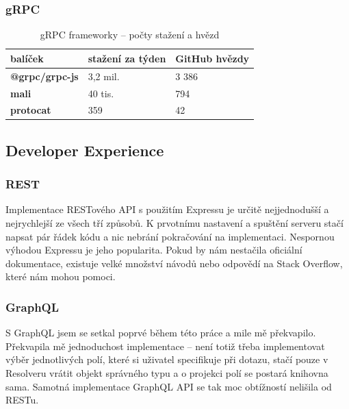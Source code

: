 \documentclass[thesis=M,czech]{FITthesis}[2019/12/23]
\begin{document}
\subsubsection*{gRPC}
\begin{table}[h]
  \begin{tabular}{|l|l|l|}
  \hline
  \textbf{balíček}                                 & \textbf{stažení za týden}                           & \textbf{GitHub hvězdy} \\ \hline
  \textbf{@grpc/grpc-js}                           & 3,2 mil.                                            & 3 386                  \\ \hline
  \textbf{mali}                                    & 40 tis.                                             & 794                    \\ \hline
  \textbf{protocat}                                & 359                                                 & 42                     \\ \hline
  \end{tabular}
  \caption{gRPC frameworky -- počty stažení a hvězd \cite{grpc_trends}}
\end{table}

\subsection{Developer Experience}
\subsubsection*{REST}
Implementace RESTového API s použitím Expressu je určitě nejjednodušší a nejrychlejší ze všech tří způsobů. K prvotnímu nastavení a spuštění serveru stačí napsat pár řádek kódu a nic nebrání pokračování na implementaci.
Nespornou výhodou Expressu je jeho popularita. Pokud by nám nestačila oficiální dokumentace, existuje velké množství návodů nebo odpovědí na Stack Overflow, které nám mohou pomoci.

\subsubsection*{GraphQL}
S GraphQL jsem se setkal poprvé během této práce a mile mě překvapilo. Překvapila mě jednoduchost implementace -- není totiž třeba implementovat výběr jednotlivých polí, které si uživatel specifikuje při dotazu, stačí pouze v Resolveru vrátit objekt správného typu a o projekci polí se postará knihovna sama. Samotná implementace GraphQL API se tak moc obtížností nelišila od RESTu. 
\end{document}
